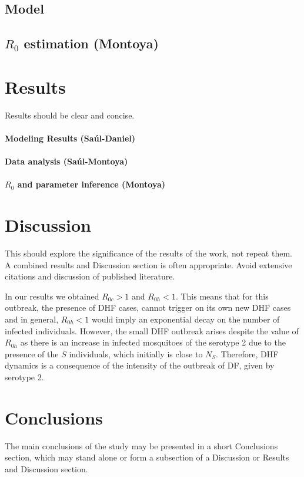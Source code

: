 \documentclass[5p, authoryear, final, sort&compress, times]{elsarticle}
\begin{document}
		\subsection*{Model}
			
			
			
		\subsection{$R_0$ estimation (Montoya)}
	\section{Results}
		Results should be clear and concise.
		\paragraph{Modeling Results (Saúl-Daniel)}
\paragraph{Data analysis (Saúl-Montoya)}
		\paragraph{$R_0$ and parameter inference (Montoya)}

	\section{Discussion}
		This should explore the significance of the results of 
    the work, not repeat them. A combined results and 
    Discussion section is often appropriate. Avoid extensive 
    citations and discussion of published literature.

    In our results we obtained $R_{0c}>1$ and  $R_{0h}<1$. This means that for this outbreak, the presence of DHF cases, cannot trigger on its own new DHF cases and in general, $R_{0h}<1$ would imply an exponential decay on the number of infected individuals. However, the small DHF outbreak arises despite the value of $R_{0h}$ as there is an increase in infected mosquitoes of the serotype 2 due to the presence of the $S$ individuals, which initially is close to $N_S$. Therefore, DHF dynamics is a consequence of the intensity of the outbreak of DF, given by serotype 2. 
    
    
    
	\section{Conclusions}
	The main conclusions of the study may be presented in a 
    short Conclusions section, which may stand alone or form 
    a subsection of a Discussion or Results and Discussion 
    section.
	
	
\end{document}

